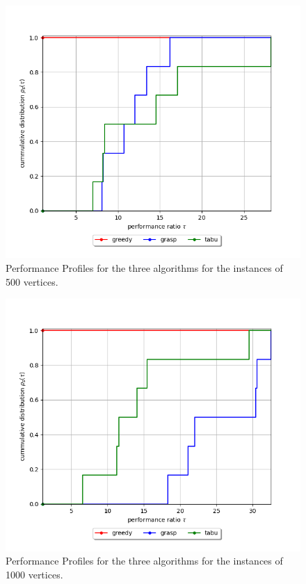 \begin{figure}
    \centering
    \includegraphics[width=\textwidth]{images/performance_profile/500_thmax_None.png}
    \caption{Performance Profiles for the three algorithms for the instances of 500 vertices.}
    \label{fig:perf-500}
\end{figure}


\begin{figure}
    \centering
    \includegraphics[width=\textwidth]{images/performance_profile/1000_thmax_None.png}
    \caption{Performance Profiles for the three algorithms for the instances of 1000 vertices.}
    \label{fig:perf-1000}
\end{figure}
